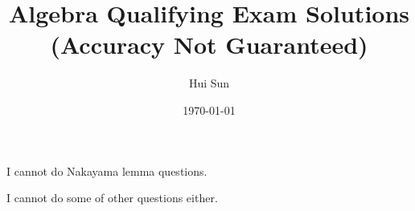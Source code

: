 \documentclass[openany]{book}
\title{Algebra Qualifying Exam Solutions
\\ 
\vspace{0.4cm}
\large (Accuracy Not Guaranteed)}
\date{\today}
\author{Hui Sun}
\begin{document}
\maketitle

\tableofcontents
\newpage


\begin{warn}
    I cannot do Nakayama lemma questions.
\end{warn}

\begin{warn}
    I cannot do some of other questions either.
\end{warn}













\end{document}
